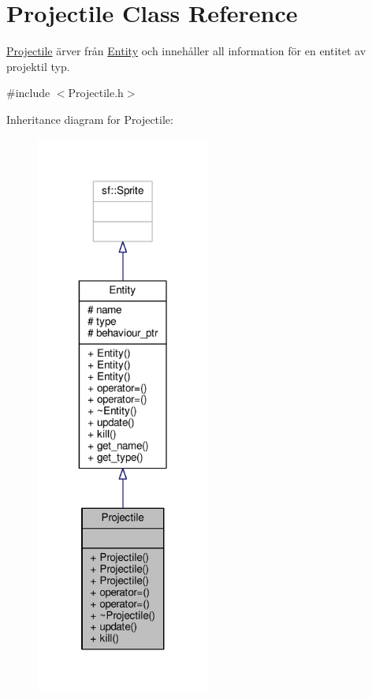 \hypertarget{classProjectile}{\section{Projectile Class Reference}
\label{classProjectile}
}


\hyperlink{classProjectile}{Projectile} ärver från \hyperlink{classEntity}{Entity} och innehåller all information för en entitet av projektil typ.  




{\ttfamily \#include $<$Projectile.\+h$>$}



Inheritance diagram for Projectile\+:\nopagebreak
\begin{figure}[H]
\begin{center}
\leavevmode
\includegraphics[width=162pt]{classProjectile__inherit__graph}
\end{center}
\end{figure}


